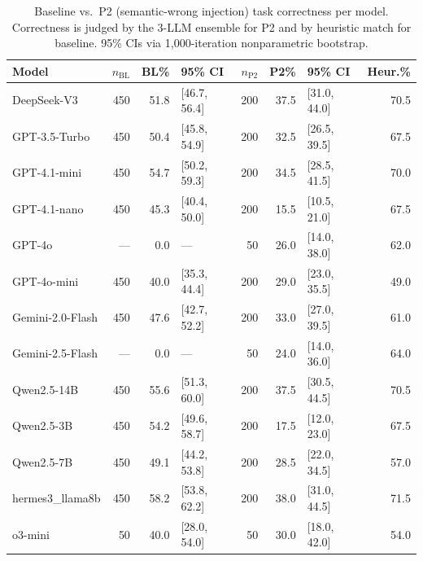 \begin{table}[t]
\centering
\caption{Baseline vs.\ P2 (semantic-wrong injection) task correctness per model. Correctness is judged by the 3-LLM ensemble for P2 and by heuristic match for baseline. 95\% CIs via 1{,}000-iteration nonparametric bootstrap.}
\label{tab:main}
\small
\begin{tabular}{l r r l r r l r}
\toprule
Model & $n_{\mathrm{BL}}$ & BL\% & 95\% CI & $n_{\mathrm{P2}}$ & P2\% & 95\% CI & Heur.\% \\
\midrule
DeepSeek-V3 & 450 & 51.8 & [46.7, 56.4] & 200 & 37.5 & [31.0, 44.0] & 70.5 \\
GPT-3.5-Turbo & 450 & 50.4 & [45.8, 54.9] & 200 & 32.5 & [26.5, 39.5] & 67.5 \\
GPT-4.1-mini & 450 & 54.7 & [50.2, 59.3] & 200 & 34.5 & [28.5, 41.5] & 70.0 \\
GPT-4.1-nano & 450 & 45.3 & [40.4, 50.0] & 200 & 15.5 & [10.5, 21.0] & 67.5 \\
GPT-4o & --- & 0.0 & --- & 50 & 26.0 & [14.0, 38.0] & 62.0 \\
GPT-4o-mini & 450 & 40.0 & [35.3, 44.4] & 200 & 29.0 & [23.0, 35.5] & 49.0 \\
Gemini-2.0-Flash & 450 & 47.6 & [42.7, 52.2] & 200 & 33.0 & [27.0, 39.5] & 61.0 \\
Gemini-2.5-Flash & --- & 0.0 & --- & 50 & 24.0 & [14.0, 36.0] & 64.0 \\
Qwen2.5-14B & 450 & 55.6 & [51.3, 60.0] & 200 & 37.5 & [30.5, 44.5] & 70.5 \\
Qwen2.5-3B & 450 & 54.2 & [49.6, 58.7] & 200 & 17.5 & [12.0, 23.0] & 67.5 \\
Qwen2.5-7B & 450 & 49.1 & [44.2, 53.8] & 200 & 28.5 & [22.0, 34.5] & 57.0 \\
hermes3_llama8b & 450 & 58.2 & [53.8, 62.2] & 200 & 38.0 & [31.0, 44.5] & 71.5 \\
o3-mini & 50 & 40.0 & [28.0, 54.0] & 50 & 30.0 & [18.0, 42.0] & 54.0 \\
\bottomrule
\end{tabular}
\end{table}